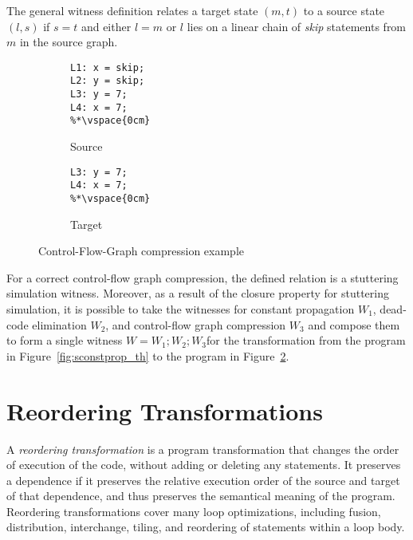 The general witness definition relates a target state $(m,t)$ to a source state $(l,s)$ if $s = t$ and either $l = m$ or $l$ lies on a linear chain of \emph{skip} statements from $m$ in the source graph.

\begin{figure}[t]
  \begin{mdframed}
  \centering
  \begin{subfigure}[b]{0.49\textwidth}
    \centering
    \begin{lstlisting}
L1: x = skip;
L2: y = skip;
L3: y = 7;
L4: x = 7;
%*\vspace{0cm}
    \end{lstlisting}
    \caption{Source}
    \label{fig:scfgc_th}
  \end{subfigure}
  \begin{subfigure}[b]{0.49\textwidth}
    \centering
    \begin{lstlisting}
L3: y = 7;
L4: x = 7;
%*\vspace{0cm}
    \end{lstlisting}
    \caption{Target}
    \label{fig:tcfgc_th}
  \end{subfigure}
  \end{mdframed}
  \caption{Control-Flow-Graph compression example}
  \label{fig:cfgc_th}
\end{figure}

For a correct control-flow graph compression, the defined relation is a stuttering simulation witness. Moreover, as a result of the closure property for stuttering simulation, it is possible to take the witnesses for constant propagation $W_1$, dead-code elimination $W_2$, and control-flow graph compression $W_3$ and compose them to form a single witness $W = W_1;W_2;W_3$for the transformation from the program in Figure~\ref{fig:sconstprop_th} to the program in Figure~\ref{fig:tcfgc_th}.

\section{Reordering Transformations}
\label{sec:reordering_transformations}

A \emph{reordering transformation} is a program transformation that changes the order of execution of the code, without adding or deleting any statements. It preserves a dependence if it preserves the relative execution order of the source and target of that dependence, and thus preserves the semantical meaning of the program. Reordering transformations cover many loop optimizations, including fusion, distribution, interchange, tiling, and reordering of statements within a loop body.

